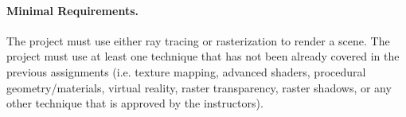 \documentclass[11pt]{article}
\begin{document}
\paragraph{Minimal Requirements.} The project must use either ray tracing or rasterization to render a scene. The project must use at least one technique that has not been already covered in the previous assignments (i.e. texture mapping, advanced shaders, procedural geometry/materials, virtual reality, raster transparency, raster shadows, or any other technique that is approved by the instructors).

%
%
\end{document}
